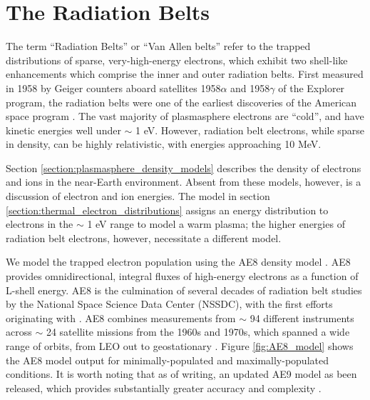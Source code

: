 \section{The Radiation Belts}
The term ``Radiation Belts'' or ``Van Allen belts'' refer to the trapped distributions of sparse, very-high-energy electrons, which exhibit two shell-like enhancements which comprise the inner and outer radiation belts. First measured in 1958 by Geiger counters aboard satellites 1958$\alpha$ and 1958$\gamma$ of the Explorer program, the radiation belts were one of the earliest discoveries of the American space program \citep{VanAllen1958}. The vast majority of plasmasphere electrons are ``cold'', and have kinetic energies well under $\sim$ 1 eV. However, radiation belt electrons, while sparse in density, can be highly relativistic, with energies approaching 10 MeV.

Section \ref{section:plasmasphere_density_models} describes the density of electrons and ions in the near-Earth environment. Absent from these models, however, is a discussion of electron and ion energies. The model in section \ref{section:thermal_electron_distributions} assigns an energy distribution to electrons in the $\sim$ 1 eV range to model a warm plasma; the higher energies of radiation belt electrons, however, necessitate a different model.

We model the trapped electron population using the AE8 density model \citep{Vette1991}. AE8 provides omnidirectional, integral fluxes of high-energy electrons as a function of L-shell energy. AE8 is the culmination of several decades of radiation belt studies by the National Space Science Data Center (NSSDC), with the first efforts originating with \cite{Vette1966}. AE8 combines measurements from $\sim$ 94 different instruments across $\sim$ 24 satellite missions from the 1960s and 1970s, which spanned a wide range of orbits, from LEO out to geostationary \citep{Cayton2005}. Figure \ref{fig:AE8_model} shows the AE8 model output for minimally-populated and maximally-populated conditions. It is worth noting that as of writing, an updated AE9 model as been released, which provides substantially greater accuracy and complexity \citep{Ginet2014}.

